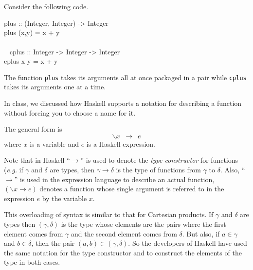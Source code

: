 \documentclass[11pt]{article}
\begin{document}

\section{}



\section{}
Consider the following code.

\begin{program*}

\> plus :: (Integer, Integer) -> Integer \\
\> plus (x,y) = x + y \\
\>   \\\
\> cplus :: Integer -> Integer -> Integer \\
\> cplus x y = x + y \\
\end{program*}


The function {\tt{plus}} takes its arguments all at once packaged in a pair
while {\tt{cplus}} takes its arguments one at a time.

In class, we discussed how Haskell supports a notation for describing a
function without forcing you to choose a name for it.

The general form is 
\[ \backslash x \;\;\rightarrow\:\; e \]
where $x$ is a variable and $e$ is a Haskell expression.

Note that in Haskell ``$\rightarrow$'' is used to denote the {\em{type
constructor}} for functions ({\em{e.g.}} if $\gamma$ and $\delta$ are types,
then $\gamma \rightarrow \delta$ is the type of functions from $\gamma$ to
$\delta$.  Also, ``$\rightarrow$'' is used in the expression language to
describe an actual function, $(\backslash x \rightarrow e)$ denotes a function
whose single argument is referred to in the expression $e$ by the variable $x$.

This overloading of syntax is similar to that for Cartesian products.  If
$\gamma$ and $\delta$ are types then $(\gamma,\delta)$ is the type whose
elements are the pairs where the first element comes from $\gamma$ and the
second element comes from $\delta$. But also, if $a\in\gamma$ and $b\in\delta$,
then the pair $(a,b)\in(\gamma,\delta)$.  So the developers of Haskell have
used the same notation for the type constructor and to construct the elements
of the type in both cases.
\end{document}
